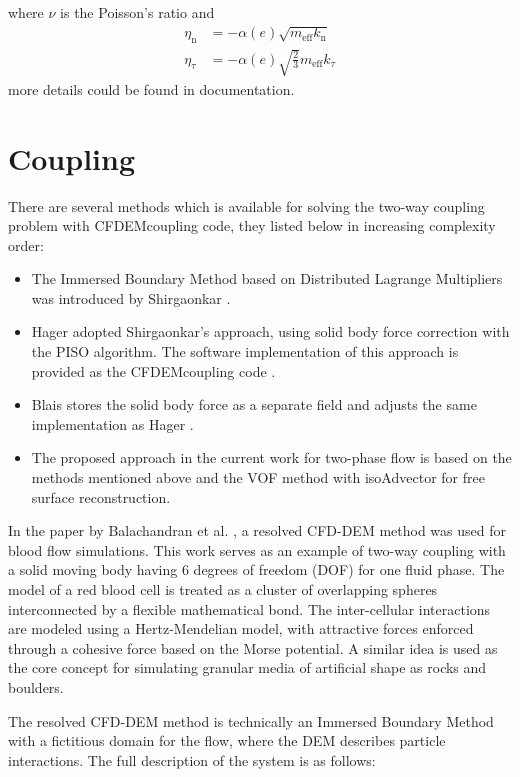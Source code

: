 where $\nu$ is the Poisson’s ratio and 
\begin{equation}
\begin{aligned}
 \eta_{\mathrm{n}} &= -\alpha(e) \sqrt{m_{\mathrm{eff}} k_{\mathrm{n}}} \\
 \eta_{\tau} &= -\alpha(e) \sqrt{\frac{2}{3}} m_{\mathrm{eff}} k_{\tau}
\end{aligned}
\end{equation}
more details could be found in \cite{LIGGGHTS} documentation.

\section{Coupling}
There are several methods which is available for solving the two-way coupling problem with CFDEMcoupling code, they listed below in increasing complexity order:
\begin{itemize}
\item The Immersed Boundary Method based on Distributed Lagrange Multipliers \cite{glowinski1999distributed} was introduced by Shirgaonkar \cite{shirgaonkar2009new}.
\item Hager \cite{hager2014cfd} adopted Shirgaonkar's approach, using solid body force correction with the PISO algorithm. The software implementation of this approach is provided as the CFDEMcoupling code \cite{kloss2012models}.
\item Blais \cite{blais2016semi} stores the solid body force as a separate field and adjusts the same implementation as Hager \cite{kloss2012models}.
\item The proposed approach in the current work for two-phase flow is based on the methods mentioned above and the VOF method with isoAdvector for free surface reconstruction.
\end{itemize}
In the paper by Balachandran et al. \cite{balachandran2021resolved}, a resolved CFD-DEM method was used for blood flow simulations. This work serves as an example of two-way coupling with a solid moving body having 6 degrees of freedom (DOF) for one fluid phase. The model of a red blood cell is treated as a cluster of overlapping spheres interconnected by a flexible mathematical bond. The inter-cellular interactions are modeled using a Hertz-Mendelian model, with attractive forces enforced through a cohesive force based on the Morse potential. A similar idea is used as the core concept for simulating granular media of artificial shape as rocks and boulders.

The resolved CFD-DEM method is technically an Immersed Boundary Method with a fictitious domain for the flow, where the DEM describes particle interactions. The full description of the system is as follows:

